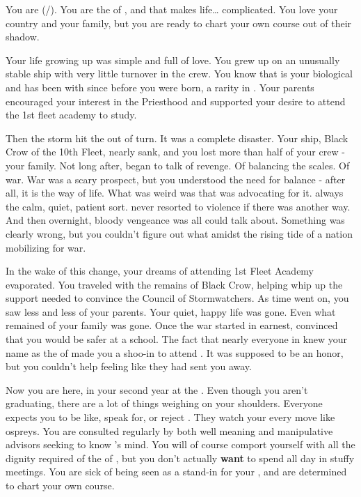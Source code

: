 \documentclass[char]{GL2020}
\begin{document}
\name{\cWarlordDaughter{}}

You are \cWarlordDaughter{\full} (\cWarlordDaughter{\they}/\cWarlordDaughter{\them}). You are the \cWarlordDaughter{\child} of \cLoud{\full}, and that makes life\ldots{} complicated. You love your country and your family, but you are ready to chart your own course out of their shadow.

Your life growing up was simple and full of love. You grew up on an unusually stable ship with very little turnover in the crew. You know that \cLoud{} is your biological \cLoud{\parent} and has been with \cQuiet{\full} since before you were born, a rarity in \pShip{}. Your parents encouraged your interest in the Priesthood and supported your desire to attend the 1st fleet academy to study.

Then the storm hit the \pShip{} out of turn. It was a complete disaster. Your ship, Black Crow of the 10th Fleet, nearly sank, and you lost more than half of your crew - your family. Not long after, \cLoud{} began to talk of revenge. Of balancing the scales. Of war. War was a scary prospect, but you understood the need for balance - after all, it is the \pShippies{} way of life. What was weird was that \cLoud{} was advocating for it. \cLoud{\They} \cLoud{\were} always the calm, quiet, patient sort. \cLoud{\They} never resorted to violence if there was another way. And then overnight, bloody vengeance was all \cLoud{\they} could talk about. Something was clearly wrong, but you couldn't figure out what amidst the rising tide of a nation mobilizing for war.

In the wake of this change, your dreams of attending 1st Fleet Academy evaporated. You traveled with the remains of Black Crow, helping \cLoud{} whip up the support \cLoud{\they} needed to convince the Council of Stormwatchers. As time went on, you saw less and less of your parents. Your quiet, happy life was gone. Even what remained of your family was gone. Once the war started in earnest, \cQuiet{} convinced \cLoud{} that you would be safer at a school. The fact that nearly everyone in \pShip{} knew your name as the \cWarlordDaughter{\child} of \cLoud{} made you a shoo-in to attend \pSchool{}. It was supposed to be an honor, but you couldn't help feeling like they had sent you away.

Now you are here, in your second year at the \pSchool{}. Even though you aren't graduating, there are a lot of things weighing on your shoulders. Everyone expects you to be like, speak for, or reject \cLoud{}. They watch your every move like ospreys. You are consulted regularly by both well meaning and manipulative advisors seeking to know \cLoud{}'s mind. You will of course comport yourself with all the dignity required of the \cWarlordDaughter{\child} of \cLoud{\full}, but you don't actually \textbf{want} to spend all day in stuffy meetings. You are sick of being seen as a stand-in for your \cLoud{\parent}, and are determined to chart your own course.
\end{document}
